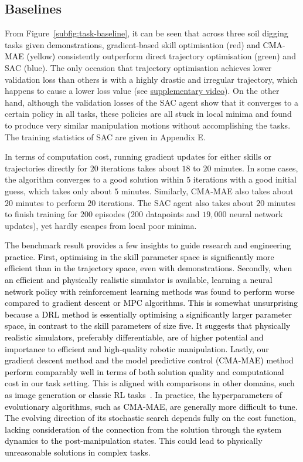\documentclass[letterpaper, 10 pt, journal, twoside]{ieeetran}
\newcommand{\rp}[1]{\textcolor{black}{#1}}
\begin{document}
\subsection{Baselines} 
From Figure~\ref{subfig:task-baseline}, it can be seen that across three \rp{soil digging} tasks \rp{given demonstrations}, gradient-based skill optimisation (red) \rp{and CMA-MAE (yellow)} consistently outperform direct trajectory optimisation (green) and SAC (blue). The only occasion that trajectory optimisation achieves lower validation loss than others is with a highly drastic and irregular trajectory, which happens to cause a lower loss value (see \href{https://www.youtube.com/watch?v=eoNx5V688H0}{supplementary video}). On the other hand, although the validation losses of the SAC agent show that it converges to a certain policy in all tasks, these policies are all stuck in local minima and found to produce very similar manipulation motions without accomplishing the tasks. The training statistics of SAC are given in Appendix E. 

In terms of computation cost, running gradient updates for either skills or trajectories directly for $20$ iterations takes about $18$ to $20$ minutes. In some cases, the algorithm converges to a good solution within $5$ iterations with a good initial guess, which takes only about $5$ minutes. Similarly, CMA-MAE also takes about $20$ minutes to perform $20$ iterations. The SAC agent also takes about $20$ minutes to finish training for $200$ episodes ($200$ datapoints and $19,000$ neural network updates), yet hardly escapes from local poor minima. 

\rp{The benchmark result provides a few insights to guide research and engineering practice. First, optimising in the skill parameter space is significantly more efficient than in the trajectory space, even with demonstrations. Secondly, when an efficient and physically realistic simulator is available, learning a neural network policy with reinforcement learning methods was found to perform worse compared to gradient descent or MPC algorithms. This is somewhat unsurprising because a DRL method is essentially optimising a significantly larger parameter space, in contrast to the skill parameters of size five. It suggests that physically realistic simulators, preferably differentiable, are of higher potential and importance to efficient and high-quality robotic manipulation. Lastly, our gradient descent method and the model predictive control (CMA-MAE) method perform comparably well in terms of both solution quality and computational cost in our task setting. This is aligned with comparisons in other domains, such as image generation or classic RL tasks~\cite{zhao2025cmamae-exp}. In practice, the hyperparameters of evolutionary algorithms, such as CMA-MAE, are generally more difficult to tune. The evolving direction of its stochastic search depends fully on the cost function, lacking consideration of the connection from the solution through the system dynamics to the post-manipulation states. This could lead to physically unreasonable solutions in complex tasks.}
\end{document}
